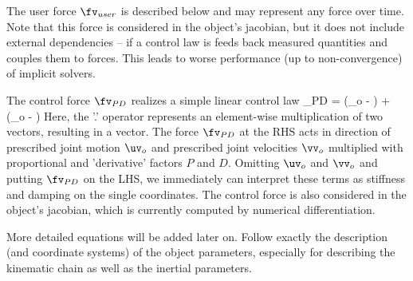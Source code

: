     The user force $\fv_{user}$ is described below and may represent any force over time.
    Note that this force is considered in the object's jacobian, but it does not include external 
    dependencies -- if a control law is feeds back measured quantities and couples them to forces.
    This leads to worse performance (up to non-convergence) of implicit solvers.
    
    The control force $\fv_{PD}$ realizes a simple linear control law
    \be
      \fv_{PD} = \Pm \cdot (\uv_o - \qv) + \Dm \cdot (\vv_o - \dot \qv)
    \ee
    Here, the '.' operator represents an element-wise multiplication of two vectors, resulting in a vector.
    The force $\fv_{PD}$ at the \ac{RHS} acts in direction of prescribed joint motion $\uv_o$ and
    prescribed joint velocities $\vv_o$ multiplied with proportional and 'derivative' factors $P$ and $D$.
    Omitting $\uv_o$ and $\vv_o$ and putting $\fv_{PD}$ on the \ac{LHS}, we immediately can interpret these
    terms as stiffness and damping on the single coordinates.
    The control force is also considered in the object's jacobian, which is currently computed by numerical
    differentiation.
        
    More detailed equations will be added later on. Follow exactly the description (and coordinate systems) of the object parameters,
    especially for describing the kinematic chain as well as the inertial parameters.

